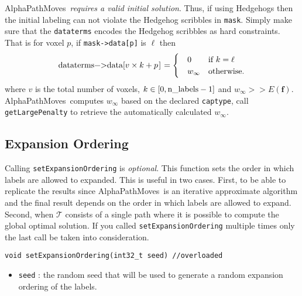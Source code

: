 \documentclass[12pt,letterpaper]{article}
\def\APM{{\ttfamily AlphaPathMoves}~}
\def\Tree{\mathcal{T}}
\def\labelvars{\mathbf{f}}
\def\Tree{\mathcal{T}}
\begin{document}
\begin{tcolorbox}
\APM {\em requires a valid initial solution}. Thus, if using Hedgehogs then the initial labeling can not violate the Hedgehog scribbles in \lstinline{mask}. Simply make sure that the \lstinline{dataterms} encodes the  Hedgehog scribbles as hard constraints. That is for voxel $p$,
if \lstinline{mask->data[p]} is $\ell$ then
\begin{equation*}
     \text{\lstinline{dataterms->data[}} v \times k+ p \text{\lstinline{]}}=
     \begin{cases}
        \quad 0 & \mbox{if } k = \ell \\
       \quad  w_\infty  & \mbox{otherwise.}
     \end{cases}
\end{equation*}
where $v$ is the total number of voxels, $k \in [0,\text{\lstinline{n_labels}}-1]$ and $w_\infty >> E(\labelvars)$. \APM computes $w_\infty$ based on the declared \lstinline{captype}, call \lstinline{getLargePenalty} to retrieve the automatically calculated $w_\infty$.
\end{tcolorbox}
\subsection{Expansion Ordering}
Calling \lstinline{setExpansionOrdering} is {\em optional}. This function sets the order in which labels are allowed to expanded.  This is useful in two cases. First, to be able to replicate the results since \APM is an iterative approximate algorithm and the final result depends on the order in which labels are allowed to expand. Second, when $\Tree$ consists of a single path where it is possible to compute the global optimal solution. If you called \lstinline{setExpansionOrdering} multiple times only the last call be taken into consideration.

\begin{lstlisting}
void setExpansionOrdering(int32_t seed) //overloaded
\end{lstlisting}
\begin{itemize}
\item \lstinline{seed} : the random seed that will be used to generate a random expansion ordering of the labels.
\end{itemize}
\end{document}
